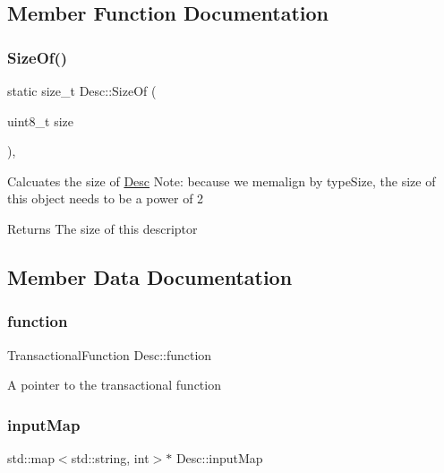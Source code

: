 \subsection{Member Function Documentation}
\mbox{\label{structDesc_a17991ab3e594e316aba8e6f3016e1f02}} 
\subsubsection{\texorpdfstring{Size\+Of()}{SizeOf()}}
{\footnotesize\ttfamily static size\+\_\+t Desc\+::\+Size\+Of (\begin{DoxyParamCaption}\item[{uint8\+\_\+t}]{size }\end{DoxyParamCaption})\hspace{0.3cm}{\ttfamily [inline]}, {\ttfamily [static]}}

Calcuates the size of \hyperlink{structDesc}{Desc} Note\+: because we memalign by type\+Size, the size of this object needs to be a power of 2

\begin{DoxyReturn}{Returns}
The size of this descriptor 
\end{DoxyReturn}


\subsection{Member Data Documentation}
\mbox{\label{structDesc_a1d85f0de5ea67a2031e1675bab8acb5e}} 
\subsubsection{\texorpdfstring{function}{function}}
{\footnotesize\ttfamily Transactional\+Function Desc\+::function}

A pointer to the transactional function \mbox{\label{structDesc_a8aacd8e82f593984cf4b792bbe0d0dff}} 
\subsubsection{\texorpdfstring{input\+Map}{inputMap}}
{\footnotesize\ttfamily std\+::map$<$std\+::string, int$>$$\ast$ Desc\+::input\+Map}

